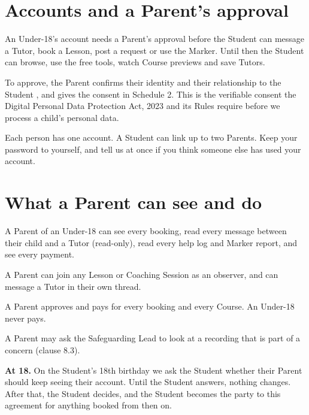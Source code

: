 \documentclass[11pt]{article}
\begin{document}
\section{Accounts and a Parent's approval}

\begin{clauses}
  \item An Under-18's account needs a Parent's approval before the Student can message a Tutor, book a Lesson, post a request or use the Marker. Until then the Student can browse, use the free tools, watch Course previews and save Tutors.
  \item To approve, the Parent confirms their identity and their relationship to the Student , and gives the consent in Schedule 2. This is the verifiable consent the Digital Personal Data Protection Act, 2023 and its Rules require before we process a child's personal data.
  \item Each person has one account. A Student can link up to two Parents. Keep your password to yourself, and tell us at once if you think someone else has used your account.
\end{clauses}

\section{What a Parent can see and do}

\begin{clauses}
  \item A Parent of an Under-18 can see every booking, read every message between their child and a Tutor (read-only), read every help log and Marker report, and see every payment.
  \item A Parent can join any Lesson or Coaching Session as an observer, and can message a Tutor in their own thread.
  \item A Parent approves and pays for every booking and every Course. An Under-18 never pays.
  \item A Parent may ask the Safeguarding Lead to look at a recording that is part of a concern (clause 8.3).
  \item \textbf{At 18.} On the Student's 18th birthday we ask the Student whether their Parent should keep seeing their account. Until the Student answers, nothing changes. After that, the Student decides, and the Student becomes the party to this agreement for anything booked from then on.
\end{clauses}
\end{document}
